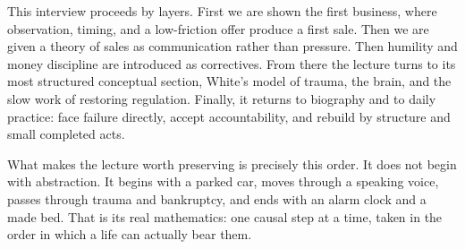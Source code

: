 This interview proceeds by layers. First we are shown the first business, where observation, timing, and a low-friction offer produce a first sale. Then we are given a theory of sales as communication rather than pressure. Then humility and money discipline are introduced as correctives. From there the lecture turns to its most structured conceptual section, White's model of trauma, the brain, and the slow work of restoring regulation. Finally, it returns to biography and to daily practice: face failure directly, accept accountability, and rebuild by structure and small completed acts.

What makes the lecture worth preserving is precisely this order. It does not begin with abstraction. It begins with a parked car, moves through a speaking voice, passes through trauma and bankruptcy, and ends with an alarm clock and a made bed. That is its real mathematics: one causal step at a time, taken in the order in which a life can actually bear them.